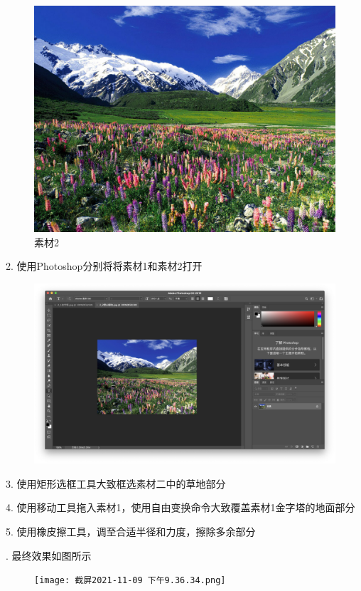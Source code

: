 \documentclass{report}
\begin{document}
\begin{figure}[!htbp]
    \centering
    \includegraphics[scale=0.5]{2_2雪山绿地.jpg}
    \caption{素材2}
\end{figure}
\clearpage

2. 使用Photoshop分别将将素材1和素材2打开

\begin{figure}[!htbp]
    \centering
    \includegraphics[scale=0.25]{截屏2021-11-09 下午9.28.38.png}
\end{figure}

3. 使用矩形选框工具大致框选素材二中的草地部分

4. 使用移动工具拖入素材1，使用自由变换命令大致覆盖素材1金字塔的地面部分

5. 使用橡皮擦工具，调至合适半径和力度，擦除多余部分

. 最终效果如图所示

\begin{figure}[!htbp]
    \centering
    \texttt{[image: 截屏2021-11-09 下午9.36.34.png]}
\end{figure}
\end{document}
